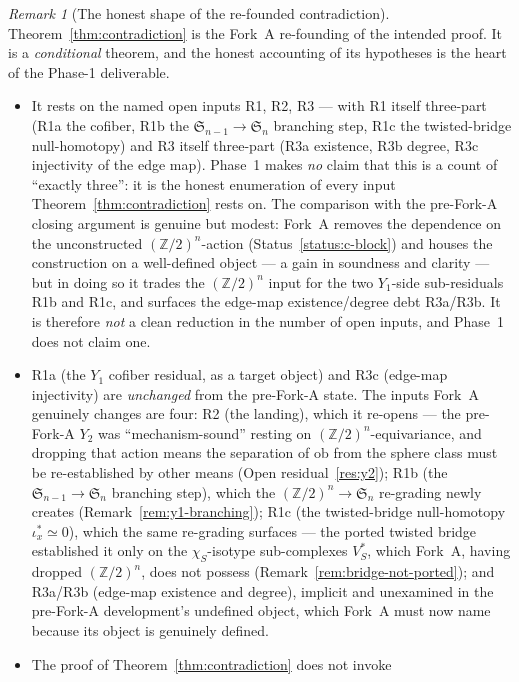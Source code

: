 \documentclass[11pt,oneside]{amsart}
\theoremstyle{plain}
\theoremstyle{definition}
\theoremstyle{remark}
\newtheorem{remark}[theorem]{Remark}
\theoremstyle{honeststyle}
\newcommand{\Sym}{\mathfrak{S}}
\newcommand{\Z}{\mathbb{Z}}
\newcommand{\ob}{\mathrm{ob}}
\newcommand{\walsh}[1]{\chi_{#1}}
\begin{document}
\begin{remark}[The honest shape of the re-founded contradiction]
\label{rem:honest-shape}
Theorem~\ref{thm:contradiction} is the Fork~A re-founding of the
intended proof. It is a \emph{conditional} theorem, and the honest
accounting of its hypotheses is the heart of the Phase-1 deliverable.
\begin{itemize}[leftmargin=1.5em]
\item It rests on the named open inputs R1, R2, R3 --- with R1 itself
  three-part (R1a the cofiber, R1b the $\Sym_{n-1}\to\Sym_n$ branching
  step, R1c the twisted-bridge null-homotopy) and R3 itself three-part
  (R3a existence, R3b degree, R3c injectivity of the edge map).
  Phase~1 makes \emph{no} claim that this is a count of ``exactly
  three'': it is the honest enumeration of every input
  Theorem~\ref{thm:contradiction} rests on. The comparison with the
  pre-Fork-A closing argument is genuine but modest: Fork~A removes
  the dependence on the unconstructed $(\Z/2)^n$-action
  (Status~\ref{status:c-block}) and houses the construction on a
  well-defined object --- a gain in soundness and clarity --- but in
  doing so it trades the $(\Z/2)^n$ input for the two $Y_1$-side
  sub-residuals R1b and R1c, and surfaces the edge-map
  existence/degree debt R3a/R3b. It is therefore \emph{not} a clean
  reduction in the number of open inputs, and Phase~1 does not claim
  one.
\item R1a (the $Y_1$ cofiber residual, as a target object) and R3c
  (edge-map injectivity) are \emph{unchanged} from the pre-Fork-A
  state. The inputs Fork~A genuinely changes are four: R2 (the
  landing), which it re-opens --- the pre-Fork-A $Y_2$ was
  ``mechanism-sound'' resting on $(\Z/2)^n$-equivariance, and dropping
  that action means the separation of $\ob$ from the sphere class must
  be re-established by other means (Open residual~\ref{res:y2}); R1b
  (the $\Sym_{n-1}\to\Sym_n$ branching step), which the
  $(\Z/2)^n\to\Sym_n$ re-grading newly creates
  (Remark~\ref{rem:y1-branching}); R1c (the twisted-bridge
  null-homotopy $\iota_x^{*}\simeq0$), which the same re-grading
  surfaces --- the ported twisted bridge established it only on the
  $\walsh{S}$-isotype sub-complexes $V_S^{*}$, which Fork~A, having
  dropped $(\Z/2)^n$, does not possess
  (Remark~\ref{rem:bridge-not-ported}); and R3a/R3b (edge-map
  existence and degree), implicit and unexamined in the pre-Fork-A
  development's undefined object, which Fork~A must now name because
  its object is genuinely defined.
\item The proof of Theorem~\ref{thm:contradiction} does not invoke

\end{itemize}
\end{remark}
\end{document}
